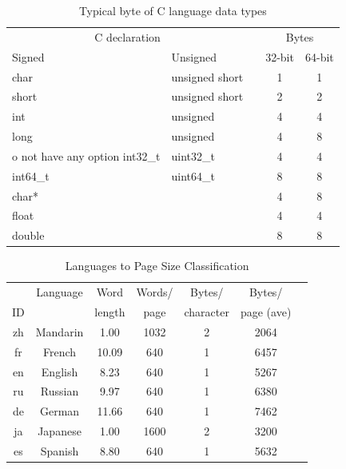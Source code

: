 \documentclass[conference]{IEEEtran}
\begin{document}
\begin{table}[htbp]
\caption{Typical byte of C language data types \cite{Bryant}}
\begin{center}
\begin{tabular}{llccc}
\hline\hline
\multicolumn{2}{c}{C declaration}  &{}&\multicolumn{2}{c}{Bytes}\\
\cline{1-2}
\cline{4-5}
Signed          &        Unsigned  &{}&  32-bit &  64-bit \\
\hline
 [signed]char   &  unsigned short  &{}&     1   &       1 \\
       short    &  unsigned short  &{}&     2   &       2 \\
          int   &        unsigned  &{}&     4   &       4 \\
         long   &        unsigned  &{}&     4   &       8 \\o not have any option 
       int32\_t &        uint32\_t &{}&     4   &       4 \\
       int64\_t &        uint64\_t &{}&     8   &       8 \\
         char*  &                  &{}&     4   &       8 \\
         float  &                  &{}&     4   &       4 \\
        double  &                  &{}&     8   &       8 \\
\hline
\end{tabular}
\label{Clang}
\end{center}
\end{table}

\begin{table}[htbp]
\caption{Languages to Page Size Classification}
\begin{center}
\begin{tabular}{|c|c|c|c|c|c|c|}
\hline
   &     Language &      Word &   Words/ &     Bytes/ &      Bytes/  \\
ID &              &    length &     page &  character &   page (ave) \\
\hline
zh & Mandarin &      1.00 &     1032 &          2 &         2064 \\
fr &   French &     10.09 &      640 &          1 &         6457 \\
en &  English &      8.23 &      640 &          1 &         5267 \\
ru &  Russian &      9.97 &      640 &          1 &         6380 \\
de &   German &     11.66 &     640 &          1 &          7462 \\
ja & Japanese &      1.00 &     1600 &          2 &         3200 \\
es &  Spanish &      8.80 &      640 &          1 &         5632 \\
\hline
\end{tabular}
\label{bytes_page}
\end{center}
\end{table}
\end{document}
